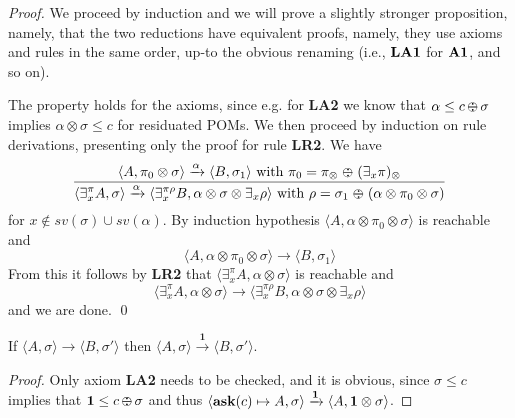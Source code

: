 \documentclass{llncs}
\newcommand{\ask}{{\bf ask}}
\def\monid{{\mathbf 0}}
\def\odiv{\, {\ominus\hspace{-7.7pt} \div} \,}
\def\monid{\mathbf{1}}
\begin{document}
{\begin{proof}
	We proceed by induction and we will prove a slightly stronger proposition, namely, that the two reductions
	have equivalent proofs, namely, they use axioms and rules in the same order,
	up-to the obvious renaming (i.e., ${\bf LA1}$ for ${\bf A1}$, and so on).
	
	The property holds for the axioms, since e.g. for {\bf LA2} we know that
	$\alpha \leq c \odiv \sigma$ implies $\alpha \otimes \sigma \leq c$ for residuated POMs.
	We then proceed by induction on rule derivations,
	presenting only the proof for rule {\bf LR2}.
	We have 
	$$\frac {\displaystyle \langle A, \pi_0 \otimes \sigma \rangle \xrightarrow{\alpha}
		\langle B, \sigma_1 \rangle \text{ with } \pi_0 = \pi_\otimes \; {\ominus\hspace{-7.5pt} \div} \; (\exists_x \pi)_\otimes }
	{\displaystyle \langle \exists^\pi_x A, \sigma \rangle \xrightarrow{\alpha}
		\langle \exists^{\pi \rho}_x B, \alpha \otimes \sigma \otimes \exists_x \rho \rangle  \text{ with } \rho = \sigma_1 \; {\ominus\hspace{-7.5pt} \div} \; (\alpha \otimes \pi_0 \otimes \sigma)}$$
	for $x \not \in sv(\sigma) \cup sv(\alpha)$.
	By induction hypothesis $\langle A, \alpha \otimes \pi_0 \otimes \sigma \rangle$ is reachable and
	$$\langle A, \alpha \otimes \pi_0 \otimes \sigma \rangle \to
	\langle B, \sigma_1 \rangle$$
	From this it follows by {\bf LR2} that $\langle \exists^\pi_x A, \alpha \otimes \sigma \rangle$ is reachable and
	$$\langle \exists^\pi_x A, \alpha \otimes \sigma \rangle \to
	\langle \exists^{\pi \rho}_x B, \alpha \otimes \sigma \otimes \exists_x \rho \rangle$$
	and we are done.
	\qed
\end{proof}

\setcounter{lemma}{11}
\begin{lemma}
	\label{idred}
	If %
	$\langle A, \sigma \rangle \to \langle B, \sigma' \rangle$
	then %
	$\langle A, \sigma \rangle \xrightarrow{\monid}  \langle B, \sigma' \rangle$.
\end{lemma}
\begin{proof}
	Only axiom  {\bf LA2} needs to be checked, and it is obvious, since $\sigma \leq c$ implies that 
	$\monid \leq c \odiv \sigma$ and thus 
	$\langle \hbox{\ask}(c) \mapsto A, \sigma \rangle \xrightarrow{\monid}
	\langle A, \monid \otimes \sigma \rangle$.
\end{proof}	

}
\end{document}
